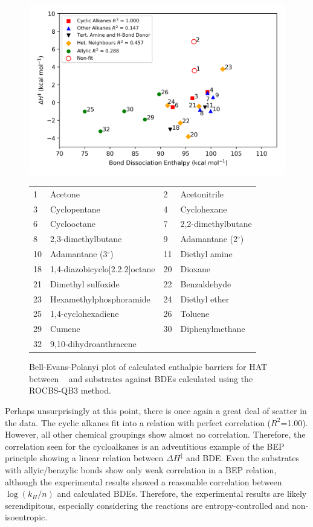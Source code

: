 \begin{figure}[!htbp]
  \centering
  \includegraphics[width=\textwidth]{figures/bep-dG}
\begin{tabularx}{\textwidth}{| l X l X |}
  \hline
  1 & Acetone & 2 & Acetonitrile \\
  3 & Cyclopentane & 4 & Cyclohexane \\
  6 & Cyclooctane & 7 & 2,2-dimethylbutane \\
  8 & 2,3-dimethylbutane & 9 & Adamantane (2$^\circ$) \\
  10 & Adamantane (3$^\circ$) & 11 & Diethyl amine \\
  18 & 1,4-diazobicyclo[2.2.2]octane & 20 & Dioxane \\
  21 & Dimethyl sulfoxide & 22 & Benzaldehyde \\
  23 & Hexamethylphosphoramide & 24 & Diethyl ether \\
  25 & 1,4-cyclohexadiene & 26 & Toluene \\
  29 & Cumene & 30 & Diphenylmethane \\
  32 & 9,10-dihydroanthracene & & \\
  \hline
\end{tabularx}
\caption{Bell-Evans-Polanyi plot of calculated enthalpic barriers for HAT between \cumo~ and substrates against BDEs calculated using the ROCBS-QB3 method.}
\label{fig:bep-dG}
\end{figure}

Perhaps unsurprisingly at this point, there is once again a great deal of scatter in the data. The cyclic alkanes fit into a relation with perfect correlation ($R^2$=1.00). However, all other chemical groupings show almost no correlation. Therefore, the correlation seen for the cycloalkanes is an adventitious example of the BEP principle showing a linear relation between $\Delta H^\ddagger$ and BDE. Even the substrates with allyic/benzylic  bonds show only weak correlation in a BEP relation, although the experimental results showed a reasonable correlation between $\log(k_H/n)$ and calculated BDEs. Therefore, the experimental results are likely serendipitous, especially considering the reactions are entropy-controlled and non-isoentropic.

